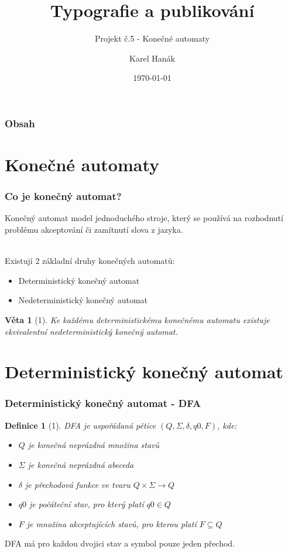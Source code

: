 \documentclass[hyperref={unicode}]{beamer}
\title{Typografie a publikování}
\subtitle{Projekt č.5 - Konečné automaty}
\author{Karel Hanák}
\institute{Vysoké učení technické v Brně \\ Fakulta informačních technologií}
\date{\today}
\newtheorem*{customdefinition}{Definice}
\newtheorem*{customsentence}{Věta}
\begin{document}
\frame{\titlepage}

\begin{frame}
\frametitle{Obsah}
\tableofcontents
\end{frame}

\section{Konečné automaty}
\begin{frame}
\frametitle{Co je konečný automat?}

Konečný automat model jednoduchého stroje, který se používá na rozhodnutí problému akceptování či zamítnutí slova z jazyka. \\~\\

\pause

Existují 2 základní druhy konečných automatů:
\begin{itemize}
\item Deterministický konečný automat
\item Nedeterministický konečný automat
\end{itemize}

\pause

\begin{customsentence}[1]\label{sen:1}
Ke každému deterministickému konečnému automatu existuje ekvivalentní nedeterministický konečný automat.
\end{customsentence}

\end{frame}

\section{Deterministický konečný automat}

\begin{frame}
\frametitle{Deterministický konečný automat - DFA}

\begin{customdefinition}[1]\label{def:1}
{\normalfont DFA} je uspořádaná pětice $(Q,\Sigma,\delta,q0,F)$, kde:
\begin{itemize}
\item $Q$ je konečná neprázdná množina stavů
\item $\Sigma$ je konečná neprázdná abeceda
\item $\delta$ je přechodová funkce ve tvaru $Q \times \Sigma \rightarrow Q$
\item $q0$ je počáteční stav, pro který platí $q0 \in Q$
\item $F$ je množina akceptujících stavů, pro kterou platí $F \subseteq Q$
\end{itemize}
\end{customdefinition}

DFA má pro každou dvojici stav a symbol pouze jeden přechod.

\end{frame}
\end{document}

